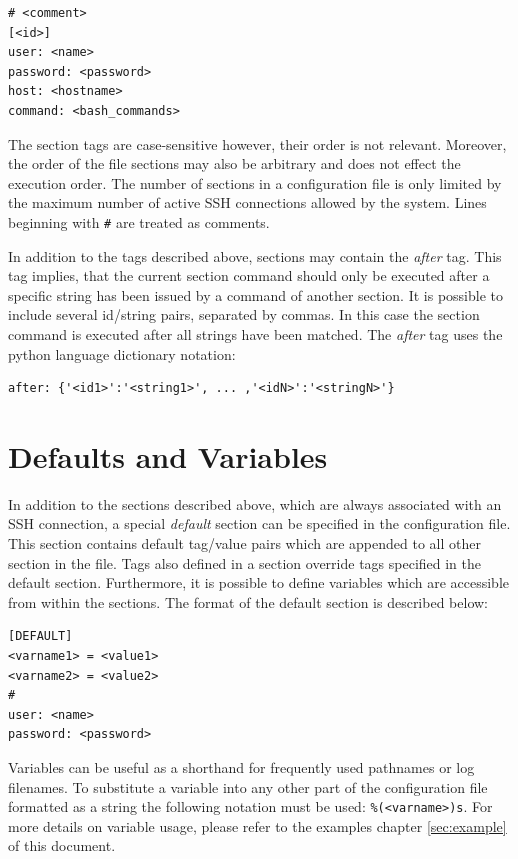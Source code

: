 \begin{Verbatim}
# <comment>
[<id>] 
user: <name>
password: <password>
host: <hostname>
command: <bash_commands>
\end{Verbatim}

The section tags are case-sensitive however, their order is not
relevant. Moreover, the order of the file sections may also be
arbitrary and does not effect the execution order. The number of
sections in a configuration file is only limited by the maximum number
of active SSH connections allowed by the system. Lines beginning with
\Verb=#= are treated as comments.

In addition to the tags described above, sections may contain the
\emph{after} tag. This tag implies, that the current section command
should only be executed after a specific string has been issued by a
command of another section. It is possible to include several
id/string pairs, separated by commas. In this case the section command
is executed after all strings have been matched. The \emph{after} tag
uses the python language dictionary notation:

\begin{Verbatim}
after: {'<id1>':'<string1>', ... ,'<idN>':'<stringN>'}
\end{Verbatim}

\section{Defaults and Variables}

In addition to the sections described above, which are always
associated with an SSH connection, a special \emph{default} section
can be specified in the configuration file. This section contains
default tag/value pairs which are appended to all other section in the
file. Tags also defined in a section override tags specified in the
default section. Furthermore, it is possible to define variables which
are accessible from within the sections. The format of the default
section is described below:

\begin{Verbatim}
[DEFAULT]
<varname1> = <value1>
<varname2> = <value2>
#
user: <name>
password: <password>
\end{Verbatim}

Variables can be useful as a shorthand for frequently used pathnames
or log filenames. To substitute a variable into any other part of the
configuration file formatted as a string the following notation must
be used: \Verb=%(<varname>)s=. For more details on variable usage,
please
refer to the examples chapter \ref{sec:example} of this document.

